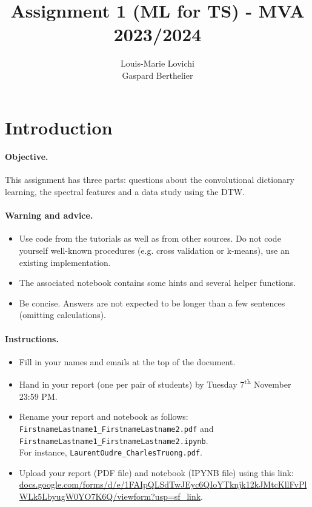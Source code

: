 \documentclass[11pt]{article}
\title{Assignment 1 (ML for TS) - MVA 2023/2024}
\author{
Louis-Marie Lovichi \email{lm.lovichi@me.com} \\ %
Gaspard Berthelier \email{gaspard.berthelier@student-cs.fr} %
}
\begin{document}
\maketitle

\section{Introduction}

\paragraph{Objective.} This assignment has three parts: questions about the convolutional dictionary learning, the spectral features and a data study using the DTW. 

\paragraph{Warning and advice.} 
\begin{itemize}
    \item Use code from the tutorials as well as from other sources. Do not code yourself well-known procedures (e.g. cross validation or k-means), use an existing implementation. 
    \item The associated notebook contains some hints and several helper functions.
    \item Be concise. Answers are not expected to be longer than a few sentences (omitting calculations).
\end{itemize}



\paragraph{Instructions.}
\begin{itemize}
    \item Fill in your names and emails at the top of the document.
    \item Hand in your report (one per pair of students) by Tuesday 7\textsuperscript{th} November 23:59 PM.
    \item Rename your report and notebook as follows:\\ \texttt{FirstnameLastname1\_FirstnameLastname2.pdf} and\\ \texttt{FirstnameLastname1\_FirstnameLastname2.ipynb}.\\
    For instance, \texttt{LaurentOudre\_CharlesTruong.pdf}.
    \item Upload your report (PDF file) and notebook (IPYNB file) using this link: \footnotesize{\href{https://docs.google.com/forms/d/e/1FAIpQLSdTwJEyc6QIoYTknjk12kJMtcKllFvPlWLk5LbyugW0YO7K6Q/viewform?usp=sf_link}{docs.google.com/forms/d/e/1FAIpQLSdTwJEyc6QIoYTknjk12kJMtcKllFvPlWLk5LbyugW0YO7K6Q/viewform?usp=sf\_link}}.
\end{itemize}
\end{document}
